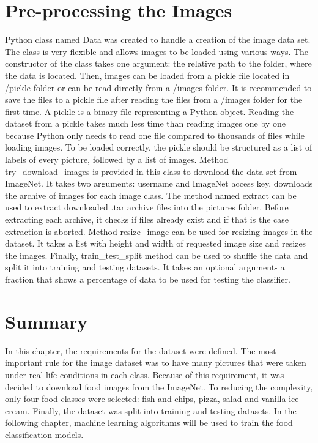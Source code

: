 \section {Pre-processing the Images}
Python class named Data was created to handle a creation of the image data set. The class is very flexible and allows images to be loaded using various ways. The constructor of the class takes one argument: the relative path to the folder, where the data is located. Then, images can be loaded from a pickle file located in /pickle folder or can be read directly from a /images folder. It is recommended to save the files to a pickle file after reading the files from a /images folder for the first time. A pickle is a binary file representing a Python object. Reading the dataset from a pickle takes much less time than reading images one by one because Python only needs to read one file compared to thousands of files while loading images. To be loaded correctly, the pickle should be structured as a list of labels of every picture, followed by a list of images. Method try\_download\_images is provided in this class to download the data set from ImageNet. It takes two arguments: username and ImageNet access key, downloads the archive of images for each image class. The method named extract can be used to extract downloaded .tar archive files into the pictures folder. Before extracting each archive, it checks if files already exist and if that is the case extraction is aborted. Method resize\_image can be used for resizing images in the dataset. It takes a list with height and width of requested image size and resizes the images.  Finally, train\_test\_split method can be used to shuffle the data and split it into training and testing datasets. It takes an optional argument- a fraction that shows a percentage of data to be used for testing the classifier.

\section{Summary}
In this chapter, the requirements for the dataset were defined. The most important rule for the image dataset was to have many pictures that were taken under real life conditions in each class.  Because of this requirement, it was decided to download food images from the ImageNet. To reducing the complexity, only four food classes were selected: fish and chips, pizza, salad and vanilla ice-cream. Finally, the dataset was split into training and testing datasets.  In the following chapter, machine learning algorithms will be used to train the food classification models.